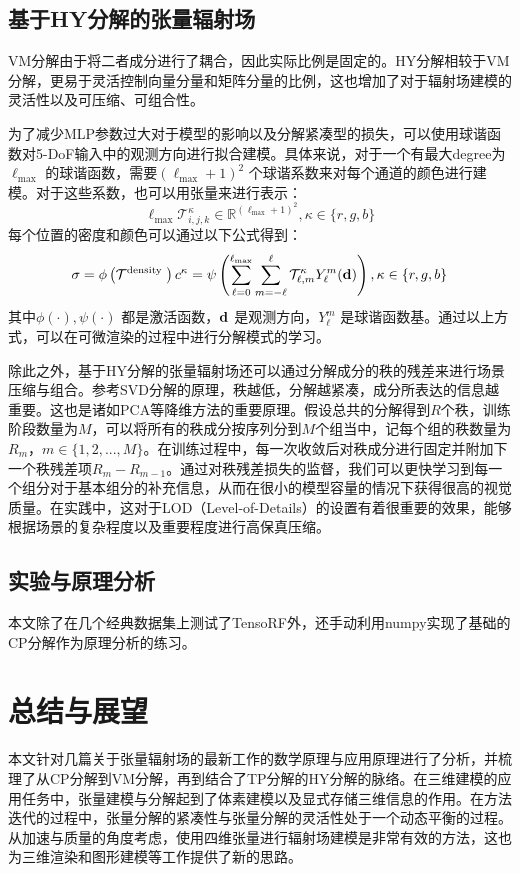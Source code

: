 \documentclass[10pt,twocolumn,letterpaper]{article}
\begin{document}
\subsection{基于HY分解的张量辐射场}

VM分解由于将二者成分进行了耦合，因此实际比例是固定的。HY分解相较于VM分解，更易于灵活控制向量分量和矩阵分量的比例，这也增加了对于辐射场建模的灵活性以及可压缩、可组合性。

为了减少MLP参数过大对于模型的影响以及分解紧凑型的损失，可以使用球谐函数对5-DoF输入中的观测方向进行拟合建模。具体来说，对于一个有最大degree为$\ell_{\max}$ 的球谐函数，需要$(\ell_{\max}+1)^2$ 个球谐系数来对每个通道的颜色进行建模。对于这些系数，也可以用张量来进行表示：
\begin{equation}
  \ell_{\max }\mathcal{T}_{i, j, k}^{\kappa} \in \mathbb{R}^{\left(\ell_{\max }+1\right)^{2}}, \kappa \in\{r, g, b\}
\end{equation}
\label{eq:11}
每个位置的密度和颜色可以通过以下公式得到：
\begin{equation}
  \sigma=\phi\left(\mathcal{T}^{\text {density }}\right) \\ c^{\kappa}=\psi\left(\sum_{\ell=0}^{\ell_{\max }} \sum_{m=-\ell}^{\ell} \mathcal{T}_{\ell, m}^{\kappa} Y_{\ell}^{m}(\mathbf{d})\right), \kappa \in\{r, g, b\}
\end{equation}
\label{eq:12}
其中$\phi(\cdot),\psi(\cdot)$ 都是激活函数，$\bold d$ 是观测方向，$Y^m_{\ell}$ 是球谐函数基。通过以上方式，可以在可微渲染的过程中进行分解模式的学习。

除此之外，基于HY分解的张量辐射场还可以通过分解成分的秩的残差来进行场景压缩与组合。参考SVD分解的原理，秩越低，分解越紧凑，成分所表达的信息越重要。这也是诸如PCA等降维方法的重要原理。假设总共的分解得到$R$个秩，训练阶段数量为$M$，可以将所有的秩成分按序列分到$M$个组当中，记每个组的秩数量为$R_m$，$m\in\{1,2,...,M\}$。在训练过程中，每一次收敛后对秩成分进行固定并附加下一个秩残差项$R_m-R_{m-1}$。通过对秩残差损失的监督，我们可以更快学习到每一个组分对于基本组分的补充信息，从而在很小的模型容量的情况下获得很高的视觉质量。在实践中，这对于LOD（Level-of-Details）的设置有着很重要的效果，能够根据场景的复杂程度以及重要程度进行高保真压缩。

\subsection{实验与原理分析}
本文除了在几个经典数据集上测试了TensoRF外，还手动利用numpy实现了基础的CP分解作为原理分析的练习。


\section{总结与展望}
\label{sec:conclusion}
本文针对几篇关于张量辐射场的最新工作的数学原理与应用原理进行了分析，并梳理了从CP分解到VM分解，再到结合了TP分解的HY分解的脉络。在三维建模的应用任务中，张量建模与分解起到了体素建模以及显式存储三维信息的作用。在方法迭代的过程中，张量分解的紧凑性与张量分解的灵活性处于一个动态平衡的过程。从加速与质量的角度考虑，使用四维张量进行辐射场建模是非常有效的方法，这也为三维渲染和图形建模等工作提供了新的思路。
\end{document}
